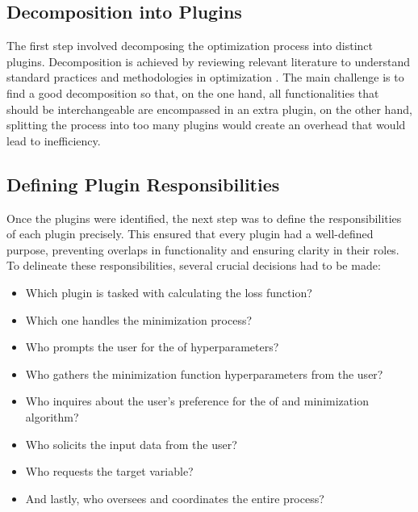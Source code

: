 \documentclass[
  a4paper,  %
  twoside,  %
  bibliography=totoc,
  headsepline,
  cleardoublepage=empty,
  parskip=half,
  draft=false
]{scrbook}
\begin{document}
\subsection{Decomposition into Plugins}
The first step involved decomposing the optimization process into distinct plugins.
Decomposition is achieved by reviewing relevant literature to understand standard practices and methodologies in optimization \cite{Virtanen2020, Nocedal2006, ShalevShwartz2014, Weinan2017}.
The main challenge is to find a good decomposition so that, on the one hand, all functionalities that should be interchangeable are encompassed in an extra plugin,
on the other hand, splitting the process into too many plugins would create an overhead that would lead to inefficiency.

\subsection{Defining Plugin Responsibilities}
Once the plugins were identified, the next step was to define the responsibilities of each plugin precisely.
This ensured that every plugin had a well-defined purpose, preventing overlaps in functionality and ensuring clarity in their roles.
To delineate these responsibilities, several crucial decisions had to be made:

\begin{itemize}
  \item Which plugin is tasked with calculating the loss function?
  \item Which one handles the minimization process?
  \item Who prompts the user for the \gls{of} hyperparameters?
  \item Who gathers the minimization function hyperparameters from the user?
  \item Who inquires about the user's preference for the \gls{of} and minimization algorithm?
  \item Who solicits the input data from the user?
  \item Who requests the target variable?
  \item And lastly, who oversees and coordinates the entire process?
\end{itemize}
\end{document}
